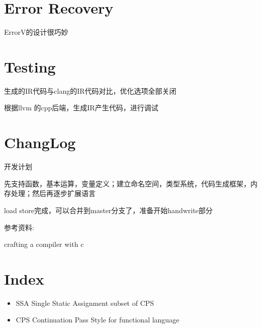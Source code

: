 \documentclass[11pt]{article} %
\begin{document}
\section{Error Recovery}
ErrorV的设计很巧妙

\section{Testing}
生成的IR代码与clang的IR代码对比，优化选项全部关闭


根据llvm 的cpp后端，生成IR产生代码，进行调试
\section{ChangLog}
开发计划 

先支持函数，基本运算，变量定义；建立命名空间，类型系统，代码生成框架，内存处理；然后再逐步扩展语言

load store完成，可以合并到master分支了，准备开始handwrite部分

参考资料:

crafting a compiler with c



\section{Index}
\begin{itemize}
\item SSA Single Static Assignment subset of CPS
\item CPS Continuation Pass Style for functional language
\end{itemize}
\end{document}

